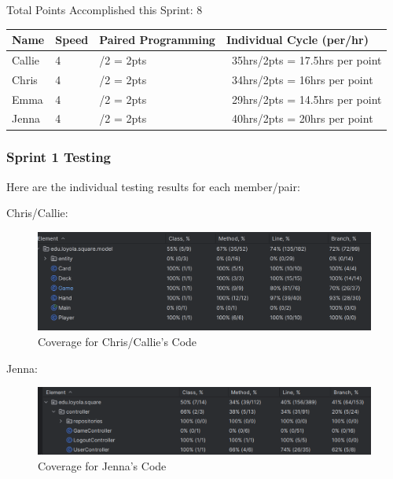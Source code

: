 Total Points Accomplished this Sprint: 8

\begin{table}[!hbt]
\begin{tabular}{|l|l|l|l|}
\hline
\multicolumn{1}{|c|}{\textbf{Name}} & \multicolumn{1}{c|}{\textbf{Speed}} & \multicolumn{1}{c|}{\textbf{Paired Programming}} & \textbf{Individual Cycle (per/hr)} \\ \hline
Callie & 4 & /2 = 2pts & ~35hrs/2pts = 17.5hrs per point   \\ \hline
Chris  & 4 & /2 = 2pts & ~34hrs/2pts = 16hrs per point \\ \hline
Emma   & 4 & /2 = 2pts & ~29hrs/2pts = 14.5hrs per point   \\ \hline
Jenna  & 4 & /2 = 2pts & ~40hrs/2pts = 20hrs per point \\ \hline
\end{tabular}
\end{table}

\subsubsection{Sprint 1 Testing}

Here are the individual testing results for each member/pair:

Chris/Callie:
\begin{figure}[!hbt]
    \centering
    \includegraphics[width=1.0\linewidth]{figures/Coverage report (Model).png}
    \caption{Coverage for Chris/Callie's Code}
    \label{Coverage report}
\end{figure}

Jenna:
\begin{figure}[!hbt]
    \centering
    \includegraphics[width=1.0\linewidth]{figures/JennaTest.png}
    \caption{Coverage for Jenna's Code}
    \label{Jenna coverage}
\end{figure}\\


